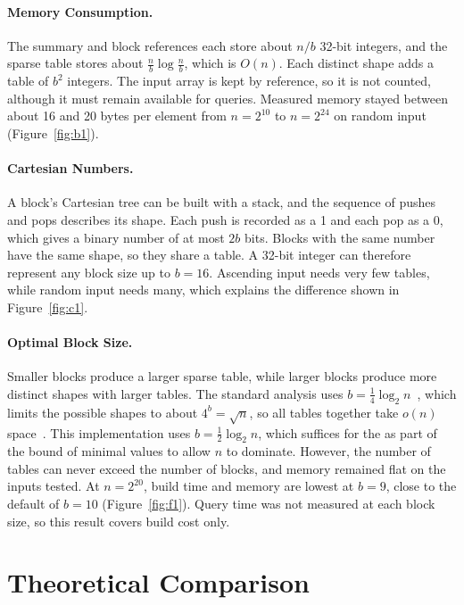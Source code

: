 \documentclass{article}
\theoremstyle{definition}
\begin{document}
\paragraph{Memory Consumption.}
The summary and block references each store about $n/b$ 32-bit integers, and the sparse table stores about $\frac{n}{b} \log \frac{n}{b}$, which is $O(n)$. Each distinct shape adds a table of $b^2$ integers. The input array is kept by reference, so it is not counted, although it must remain available for queries. Measured memory stayed between about 16 and 20 bytes per element from $n = 2^{10}$ to $n = 2^{24}$ on random input (Figure~\ref{fig:b1}).

\paragraph{Cartesian Numbers.}
A block's Cartesian tree can be built with a stack, and the sequence of pushes and pops describes its shape. Each push is recorded as a 1 and each pop as a 0, which gives a binary number of at most $2b$ bits. Blocks with the same number have the same shape, so they share a table. A 32-bit integer can therefore represent any block size up to $b = 16$. Ascending input needs very few tables, while random input needs many, which explains the difference shown in Figure~\ref{fig:c1}.

\paragraph{Optimal Block Size.}
Smaller blocks produce a larger sparse table, while larger blocks produce more distinct shapes with larger tables. The standard analysis uses $b = \frac{1}{4} \log_2 n$~\cite{cs166rmq2}, which limits the possible shapes to about $4^b = \sqrt{n}$, so all tables together take $o(n)$ space~\cite{bender2000, fischer2006}. This implementation uses $b = \frac{1}{2} \log_2 n$, which suffices for the as part of the bound of minimal values to allow $n$ to dominate. However, the number of tables can never exceed the number of blocks, and memory remained flat on the inputs tested. At $n = 2^{20}$, build time and memory are lowest at $b = 9$, close to the default of $b = 10$ (Figure~\ref{fig:f1}). Query time was not measured at each block size, so this result covers build cost only.

\section{Theoretical Comparison}
\end{document}
